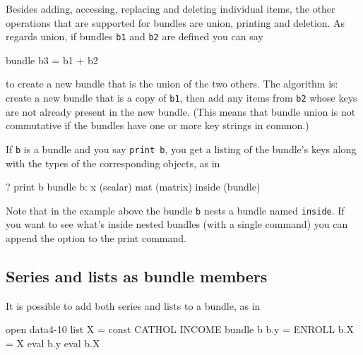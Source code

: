 Besides adding, accessing, replacing and deleting individual items,
the other operations that are supported for bundles are union,
printing and deletion. As regards union, if bundles \texttt{b1} and
\texttt{b2} are defined you can say

\begin{code}
bundle b3 = b1 + b2
\end{code}

to create a new bundle that is the union of the two others. The
algorithm is: create a new bundle that is a copy of \texttt{b1}, then
add any items from \texttt{b2} whose keys are not already present in
the new bundle. (This means that bundle union is not commutative if
the bundles have one or more key strings in common.)

If \texttt{b} is a bundle and you say \texttt{print b}, you get a
listing of the bundle's keys along with the types of the corresponding
objects, as in

\begin{code}
? print b
bundle b:
 x (scalar)
 mat (matrix)
 inside (bundle)
\end{code}

Note that in the example above the bundle \texttt{b} nests a bundle
named \texttt{inside}. If you want to see what's inside nested bundles
(with a single command) you can append the  option to the
print command.

\subsection{Series and lists as bundle members}

It is possible to add both series and lists to a bundle, as in
\begin{code}
open data4-10
list X = const CATHOL INCOME
bundle b
b.y = ENROLL
b.X = X
eval b.y
eval b.X
\end{code}

